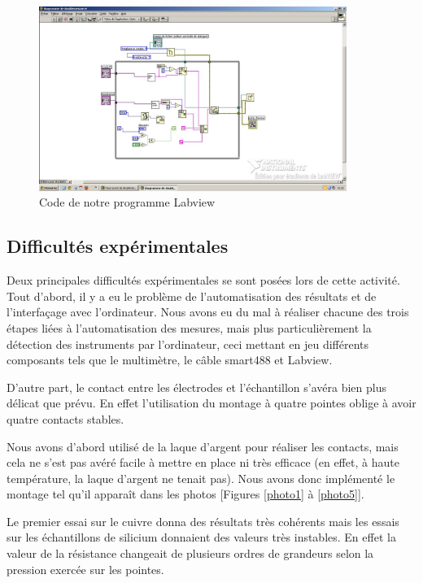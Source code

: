 \begin{figure}[!t]
  \begin{center}
		\includegraphics[height=6cm]{./images/labview.jpg}
		\caption{Code de notre programme Labview}
		\label{code_labview}
	\end{center}
\end{figure}

\newpage

\subsection{Difficultés expérimentales}
Deux principales difficultés expérimentales se sont posées lors de cette activité.
Tout d'abord, il y a eu le problème de l'automatisation des résultats et de l'interfaçage avec l'ordinateur.
Nous avons eu du mal à réaliser chacune des trois étapes liées à l'automatisation des mesures, 
mais plus particulièrement 
la détection des instruments par l'ordinateur, ceci mettant en jeu différents composants tels que le 
multimètre, le câble smart488 et Labview.

\bigskip

D'autre part, le contact entre les électrodes et l'échantillon s'avéra bien plus délicat que prévu. 
En effet l'utilisation du montage à quatre pointes oblige à avoir quatre contacts stables.

Nous avons d'abord utilisé de la laque d'argent pour réaliser les contacts, mais cela ne s'est pas avéré facile 
à mettre en place ni très efficace (en effet, à haute température, la laque d'argent ne tenait pas).
Nous avons donc implémenté le montage tel qu'il apparaît dans les photos [Figures \ref{photo1} à \ref{photo5}].

Le premier essai sur le cuivre donna des résultats 
très cohérents mais les essais sur les échantillons de silicium donnaient des valeurs très instables. 
En effet la valeur de la résistance changeait de plusieurs ordres de grandeurs selon la pression exercée sur les 
pointes.

